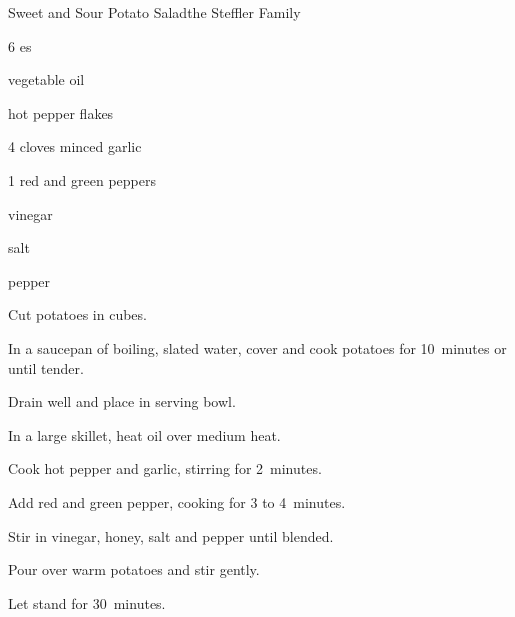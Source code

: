 \begin{recipe}{Sweet and Sour Potato Salad}{the Steffler Family}{}

\begin{ingredients}
\item 6 es
\item {} vegetable oil
\item hot pepper flakes
\item 4 cloves minced garlic
\item 1 red and green peppers
\item \C{\third} vinegar
\item {} 
\item \tp{\half} salt
\item \tp{\half} pepper
\end{ingredients}

\begin{directions}
\item Cut potatoes in  cubes.
\item In a saucepan of boiling, slated water, cover and cook potatoes for 10~minutes or until tender.
\item Drain well and place in serving bowl.
\item In a large skillet, heat oil over medium heat.
\item Cook hot pepper and garlic, stirring for 2~minutes.
\item Add red and green pepper, cooking for 3 to 4~minutes.
\item Stir in vinegar, honey, salt and pepper until blended.
\item Pour over warm potatoes and stir gently.
\item Let stand for 30~minutes.
\end{directions}
\end{recipe}
